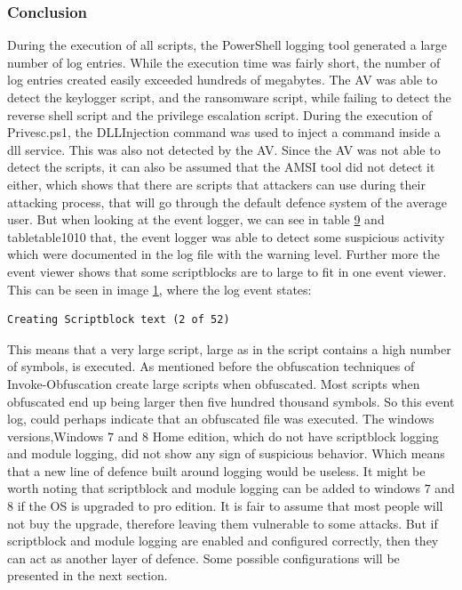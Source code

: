 \documentclass{article}%
\begin{document}
\subsubsection{Conclusion}
During the execution of all scripts, the PowerShell logging tool generated a large number of log entries. While the execution time was fairly short, the number of log entries created easily exceeded hundreds of megabytes. The AV was able to detect the keylogger script, and the ransomware script, while failing to detect the reverse shell script and the privilege escalation script. During the execution of Privesc.ps1, the DLLInjection command was used to inject a command inside a dll service. This was also not detected by the AV. Since the AV was not able to detect the scripts, it can also be assumed that the AMSI tool did not detect it either, which shows that there are scripts that attackers can use during their attacking process, that will go through the default defence system of the average user. But when looking at the event logger, we can see in table \hyperlink{table9}{9} and table{table10}{10} that, the event logger was able to detect some suspicious activity which were documented in the log file with the warning level. Further more the event viewer shows that some scriptblocks are to large to fit in one event viewer. This can be seen in image \hyperlink{fig1}{1}, where the log event states:
\begin{verbatim}
Creating Scriptblock text (2 of 52)
\end{verbatim}
This means that a very large script, large as in the script contains a high number of symbols, is executed. As mentioned before the obfuscation techniques of Invoke-Obfuscation create large scripts when obfuscated. Most scripts when obfuscated end up being larger then five hundred thousand symbols. So this event log, could perhaps indicate that an obfuscated file was executed. 
The windows versions,Windows $7$ and $8$ Home edition, which do not have scriptblock logging and module logging, did not show any sign of suspicious behavior. Which means that a new line of defence built around logging would be useless. It might be worth noting that scriptblock and module logging can be added to windows $7$ and $8$ if the OS is upgraded to pro edition. It is fair to assume that most people will not buy the upgrade, therefore leaving them vulnerable to some attacks. But if scriptblock and module logging are enabled and configured correctly, then they can act as another layer of defence. Some possible configurations will be presented in the next section.
\end{document}
